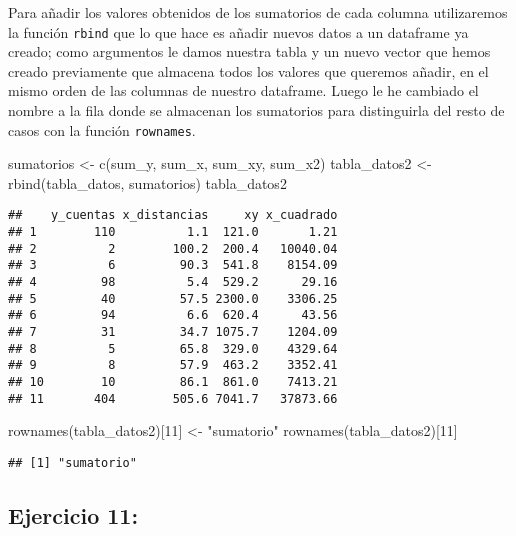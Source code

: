 \documentclass[
]{article}
\newenvironment{Shaded}{\begin{snugshade}}{\end{snugshade}}
\newcommand{\DecValTok}[1]{\textcolor[rgb]{0.00,0.00,0.81}{#1}}
\newcommand{\FunctionTok}[1]{\textcolor[rgb]{0.00,0.00,0.00}{#1}}
\newcommand{\NormalTok}[1]{#1}
\newcommand{\OtherTok}[1]{\textcolor[rgb]{0.56,0.35,0.01}{#1}}
\newcommand{\StringTok}[1]{\textcolor[rgb]{0.31,0.60,0.02}{#1}}
\begin{document}
Para añadir los valores obtenidos de los sumatorios de cada columna
utilizaremos la función \texttt{rbind} que lo que hace es añadir nuevos
datos a un dataframe ya creado; como argumentos le damos nuestra tabla y
un nuevo vector que hemos creado previamente que almacena todos los
valores que queremos añadir, en el mismo orden de las columnas de
nuestro dataframe. Luego le he cambiado el nombre a la fila donde se
almacenan los sumatorios para distinguirla del resto de casos con la
función \texttt{rownames}.

\begin{Shaded}
\begin{Highlighting}[]
\NormalTok{sumatorios }\OtherTok{\textless{}{-}} \FunctionTok{c}\NormalTok{(sum\_y, sum\_x, sum\_xy, sum\_x2)}
\NormalTok{tabla\_datos2 }\OtherTok{\textless{}{-}} \FunctionTok{rbind}\NormalTok{(tabla\_datos, sumatorios)}
\NormalTok{tabla\_datos2}
\end{Highlighting}
\end{Shaded}

\begin{verbatim}
##    y_cuentas x_distancias     xy x_cuadrado
## 1        110          1.1  121.0       1.21
## 2          2        100.2  200.4   10040.04
## 3          6         90.3  541.8    8154.09
## 4         98          5.4  529.2      29.16
## 5         40         57.5 2300.0    3306.25
## 6         94          6.6  620.4      43.56
## 7         31         34.7 1075.7    1204.09
## 8          5         65.8  329.0    4329.64
## 9          8         57.9  463.2    3352.41
## 10        10         86.1  861.0    7413.21
## 11       404        505.6 7041.7   37873.66
\end{verbatim}

\begin{Shaded}
\begin{Highlighting}[]
\FunctionTok{rownames}\NormalTok{(tabla\_datos2)[}\DecValTok{11}\NormalTok{] }\OtherTok{\textless{}{-}} \StringTok{"sumatorio"}
\FunctionTok{rownames}\NormalTok{(tabla\_datos2)[}\DecValTok{11}\NormalTok{]}
\end{Highlighting}
\end{Shaded}

\begin{verbatim}
## [1] "sumatorio"
\end{verbatim}

\hypertarget{ejercicio-11}{%
\subsection{Ejercicio 11:}\label{ejercicio-11}}
\end{document}
